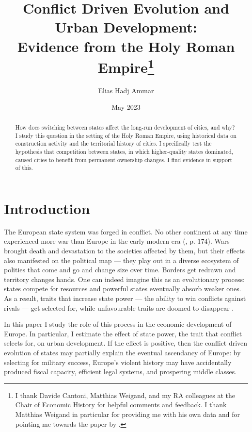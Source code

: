 \documentclass{article}
\title{Conflict Driven Evolution and Urban Development: \\ Evidence from the Holy Roman Empire\footnote{
I thank Davide Cantoni, Matthias Weigand, and my RA colleagues at the Chair of Economic History for helpful comments and feedback. I thank Matthias Weigand in particular for providing me with his own data and for pointing me towards the paper by \cite{schoenholzer2022}.
}
}
\author{Elias Hadj Ammar}
\date{May 2023}
\begin{document}
\onehalfspacing
\maketitle
\thispagestyle{empty}

\begin{abstract}
How does switching between states affect the long-run development of cities, and why? I study this question in the setting of the Holy Roman Empire, using historical data on construction activity and the territorial history of cities. I specifically test the hypothesis that competition between states, in which higher-quality states dominated, caused cities to benefit from permanent ownership changes. I find evidence in support of this.
\end{abstract}

\newpage

\setcounter{page}{1}
\doublespacing



\section{Introduction}



The European state system was forged in conflict. No other continent at any time experienced more war than Europe in the early modern era (\citealp{voigtlnder2013}, p. 174). Wars brought death and devastation to the societies affected by them, but their effects also manifested on the political map --- they play out in a diverse ecosystem of polities that come and go and change size over time. Borders get redrawn and territory changes hands. One can indeed imagine this as an evolutionary process: states compete for resources and powerful states eventually absorb weaker ones. As a result, traits that increase state power --- the ability to win conflicts against rivals --- get selected for, while unfavourable traits are doomed to disappear \citep{levine2021}.

In this paper I study the role of this process in the economic development of Europe. In particular, I estimate the effect of state power, the trait that conflict selects for, on urban development. If the effect is positive, then the conflict driven evolution of states may partially explain the eventual ascendancy of Europe: by selecting for military success, Europe's violent history may have accidentally produced fiscal capacity, efficient legal systems, and prospering middle classes.
\end{document}
